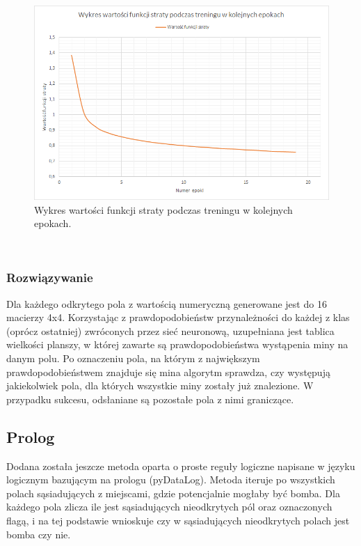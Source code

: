 \documentclass[letterpaper,12pt]{article} %
\begin{document}
\begin{figure}[h]
    \centering
    \includegraphics[scale=0.6]{funkcjastraty.png}
    \caption{Wykres wartości funkcji straty podczas treningu w kolejnych epokach.}
\end{figure} \\
\subsubsection*{Rozwiązywanie}
Dla każdego odkrytego pola z wartością numeryczną generowane jest do 16 macierzy 4x4. Korzystając z prawdopodobieństw przynależności do każdej z klas (oprócz ostatniej) zwróconych przez sieć neuronową, uzupełniana jest tablica wielkości planszy,
w której zawarte są prawdopodobieństwa wystąpenia miny na danym polu. Po oznaczeniu pola, na którym z największym prawdopodobieństwem znajduje się mina algorytm sprawdza, czy występują jakiekolwiek pola, dla których wszystkie miny zostały już znalezione. W przypadku sukcesu, 
odsłaniane są pozostałe pola z nimi graniczące.
\subsection{Prolog}
Dodana została jeszcze metoda oparta o proste reguły logiczne napisane w języku logicznym bazującym na prologu (pyDataLog).
Metoda iteruje po wszystkich polach sąsiadujących z miejscami, gdzie potencjalnie mogłaby być bomba.
Dla każdego pola zlicza ile jest sąsiadujących nieodkrytych pól oraz oznaczonych flagą, i na tej podstawie wnioskuje czy w sąsiadujących nieodkrytych polach jest bomba czy nie.
\end{document}
